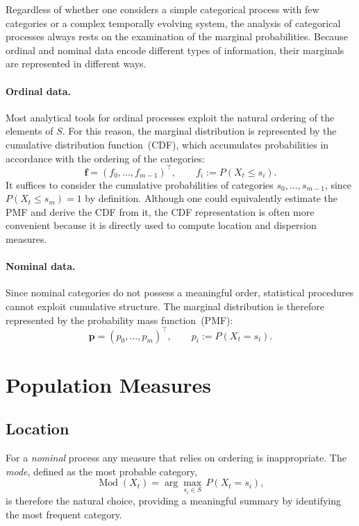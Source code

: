 \documentclass[12pt,a4paper]{scrreprt}
\DeclareMathOperator{\Mod}{Mod}
\begin{document}
Regardless of whether one considers a simple categorical process with few categories or a
complex temporally evolving system, the analysis of categorical processes always rests on the
examination of the marginal probabilities. Because ordinal and nominal data encode different
types of information, their marginals are represented in different ways.

\paragraph{Ordinal data.}
Most analytical tools for ordinal processes exploit the natural ordering of the elements of $S$.
For this reason, the marginal distribution is represented by the cumulative distribution
function~(CDF), which accumulates probabilities in accordance with the ordering of the
categories:
\[
    \mathbf{f} = (f_0, \dots, f_{m-1})^{\top},
    \qquad
    f_i := P(X_t \leq s_i).
\]
It suffices to consider the cumulative probabilities of categories $s_0, \ldots, s_{m-1}$,
since $P(X_t \leq s_m) = 1$ by definition. Although one could equivalently estimate the PMF
and derive the CDF from it, the CDF representation is often more convenient because it is
directly used to compute location and dispersion measures.

\paragraph{Nominal data.}
Since nominal categories do not possess a meaningful order, statistical procedures cannot
exploit cumulative structure. The marginal distribution is therefore represented by the
probability mass function~(PMF):
\[
    \mathbf{p} = (p_0, \dots, p_{m})^{\top},
    \qquad
    p_i := P(X_t = s_i).
\]

\section{Population Measures}

\subsection{Location}

For a \textit{nominal} process any measure that relies on ordering is inappropriate. The
\emph{mode}, defined as the most probable category,
\[
    \Mod(X_t) = \arg\max_{s_i \in S}\, P(X_t = s_i),
\]
is therefore the natural choice, providing a meaningful summary by identifying the most
frequent category.
\end{document}
